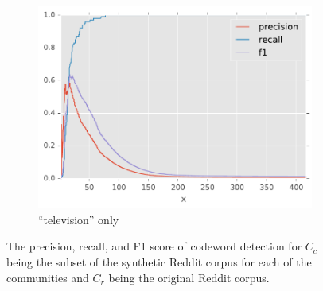 \begin{figure}[H]
\begin{subfigure}[t]{.4\textwidth}
\centering\includegraphics[]{figures/reddit-television-only-f1.pdf}
\caption{``television'' only}
\label{fig-reddit-television-only-f1}
\end{subfigure}
\caption{The precision, recall, and F1 score of codeword detection for $C_c$ being the subset of the synthetic Reddit corpus for each of the communities and $C_r$ being the original Reddit corpus.}
\label{fig-reddit-community-only-f1}
\end{figure}